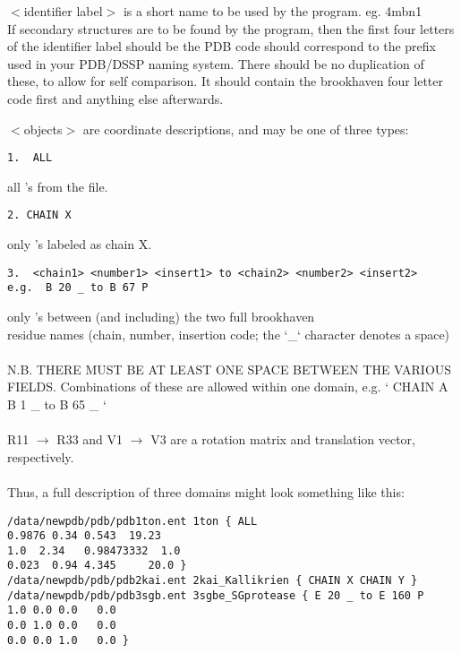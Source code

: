 $<$identifier label$>$ is a short name to be used by the program. 
eg. 4mbn1\\

If secondary structures are to be found by the program, then the
first  four letters of the identifier label should be the PDB code should
correspond to the prefix used in your PDB/DSSP naming system.
There should be no 
duplication of these, to allow for self comparison.  It should
contain  the brookhaven four letter code first and anything else 
afterwards.

$<$objects$>$ are coordinate descriptions, and may be one of three types:

\begin{scriptsize}\begin{verbatim}
1.  ALL  
\end{verbatim} \end{scriptsize}
all \Cal's from the file.\\

\begin{scriptsize}\begin{verbatim}
2. CHAIN X 
\end{verbatim} \end{scriptsize}
only \Cal's labeled as chain X.\\

\begin{scriptsize}\begin{verbatim}
3.  <chain1> <number1> <insert1> to <chain2> <number2> <insert2>
e.g.  B 20 _ to B 67 P 
\end{verbatim} \end{scriptsize}
only \Cal's between (and including) the two full brookhaven\\
residue names (chain, number, insertion code;
the `\_` character denotes a space)\\
\\
N.B. THERE MUST BE AT LEAST ONE SPACE BETWEEN THE VARIOUS FIELDS.
Combinations of these are allowed within one domain, e.g. `{ CHAIN A B 1 
\_ to B 65 \_ }`\\
\\
R11 $\rightarrow$ R33 and V1 $\rightarrow$ V3 are a rotation matrix and translation vector, respectively.\\
\\
Thus, a full description of three domains might look something
like this:\\

\begin{scriptsize}\begin{verbatim}
/data/newpdb/pdb/pdb1ton.ent 1ton { ALL 
0.9876 0.34 0.543  19.23
1.0  2.34   0.98473332  1.0
0.023  0.94 4.345     20.0 }
/data/newpdb/pdb/pdb2kai.ent 2kai_Kallikrien { CHAIN X CHAIN Y }
/data/newpdb/pdb/pdb3sgb.ent 3sgbe_SGprotease { E 20 _ to E 160 P 
1.0 0.0 0.0   0.0
0.0 1.0 0.0   0.0
0.0 0.0 1.0   0.0 }
\end{verbatim} \end{scriptsize}

